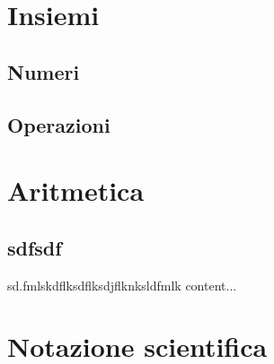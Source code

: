 \documentclass[
finale,
ssectnum,
]{DossierExMathIta}
\author{CPT}
\date{2020}
\begin{document}
\setlength{\columnsep}{0.6cm}
\indice


\section{Insiemi}
\subsection{Numeri}
\begin{questions}

\end{questions}


\subsection{Operazioni}
\begin{questions}

\end{questions}


\exnewpage



\section{Aritmetica}

\exnewpage
\subsection{sdfsdf}

\begin{questions}
	\question
	sd.fmlskdflksdflksdjflknksldfmlk
	content...
\end{questions}
\section{Notazione scientifica}

\end{document}
